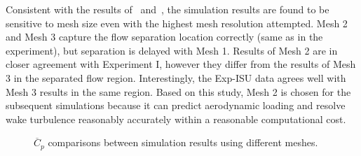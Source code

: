 Consistent with the results of~\cite{travin2000detached}
and~\cite{breuer2000challenging}, the simulation results are found to be
sensitive to mesh size even with the highest mesh resolution attempted. Mesh 2
and Mesh 3 capture the flow separation location correctly (same as in the
experiment), but separation is delayed with Mesh 1. Results of Mesh 2 are in
closer agreement with Experiment I, however they differ from the results of
Mesh 3 in the separated flow region. Interestingly, the Exp-ISU data agrees
well with Mesh 3 results in the same region. Based on this study, Mesh 2 is
chosen for the subsequent simulations because it can predict aerodynamic
loading and resolve wake turbulence reasonably accurately within a reasonable
computational cost.
%
\begin{figure}[htb!]
  \centering
  \caption{$\overline{C}_p$ comparisons between simulation results using
  different meshes.}
  \label{fig:Cp_compare_LS_Mesh}
\end{figure}

